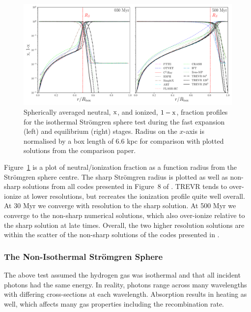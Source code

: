 \documentclass[fleq,usenatbib]{mnras}
\newcommand{\acro}{TREVR}
\newcommand{\strom}{Str\"omgren}
\begin{document}
{\begin{figure}
\includegraphics[width=0.95\linewidth]{Figures/strom_iso_fraction.pdf}
\caption{Spherically averaged neutral, $\rm x$, and ionized, $\rm 1-x$, 
fraction profiles for the isothermal \strom{} sphere test during the fast 
expansion (left) and equilibrium (right) stages. Radius on the $x$-axis is 
normalised by a box length of 6.6 kpc for comparison with plotted solutions 
from the \protect\cite{ilievEt06} comparison paper.}
\label{fig:stromiso}
\end{figure}
Figure~\ref{fig:stromiso} is a plot of neutral/ionization fraction as a 
function radius from the \strom{} sphere centre. The sharp \strom{} radius is 
plotted as well as non-sharp solutions from all codes presented in Figure~8 
of \cite{ilievEt06}. \acro{} tends to over-ionize at lower resolutions, but 
recreates the ionization profile quite well overall. At 30 Myr we converge 
with resolution to the sharp solution. At 500 Myr we converge to the non-sharp 
numerical solutions, which also over-ionize relative to the sharp solution at 
late times. Overall, the two higher resolution solutions are within the 
scatter of the non-sharp solutions of the codes presented in \cite{ilievEt06}. 

\subsubsection{The Non-Isothermal \strom{} Sphere}
The above test assumed the hydrogen gas was isothermal and that all incident 
photons had the same energy. In reality, photons range across many wavelengths 
with differing cross-sections at each wavelength. Absorption results in 
heating as well, which affects many gas properties including the recombination rate.

}
\end{document}
